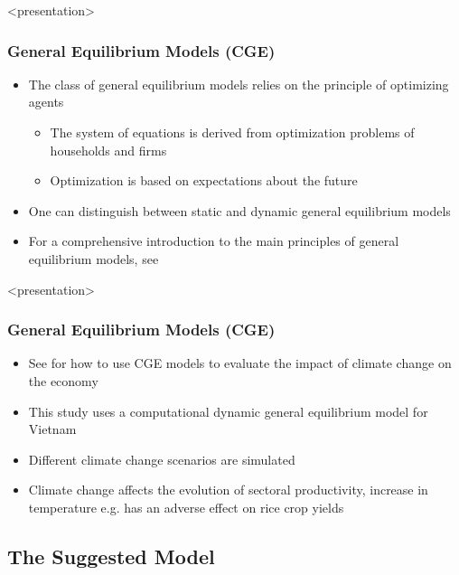 \documentclass[11pt,aspectratio=169]{beamer}
\begin{document}
\begin{frame}<presentation>
	\frametitle{General Equilibrium Models (CGE)}
	\begin{itemize}
	
		\item The class of general equilibrium models relies on the principle of optimizing agents
			\begin{itemize}
				\item The system of equations is derived from optimization problems of households and firms
				\item Optimization is based on expectations about the future
			\end{itemize}
	\item One can distinguish between static and dynamic general equilibrium models 
		\item For a comprehensive introduction to the main principles of general equilibrium models, see \cite{wing2004computable}
\end{itemize}
\end{frame}




\begin{frame}<presentation>
	\frametitle{General Equilibrium Models (CGE)}
	\begin{itemize}
		\item See \cite{arndt2015economic} for how to use CGE models to evaluate the impact of climate change on the economy
		\item This study uses a computational dynamic general equilibrium model for Vietnam
		\item Different climate change scenarios are simulated
		\item Climate change affects the evolution of sectoral productivity, increase in temperature e.g. has an adverse effect on rice crop yields
\end{itemize}
\end{frame}


\subsection{The Suggested Model}
\end{document}
